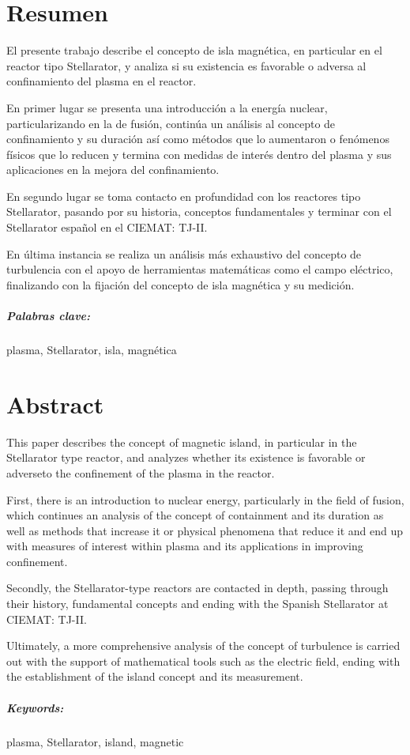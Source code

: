 \chapter*{Resumen}
El presente trabajo describe el concepto de isla magnética, en particular en el reactor tipo Stellarator, y analiza si su existencia es favorable o adversa
al confinamiento del plasma en el reactor.\par
En primer lugar se presenta una introducción a la energía nuclear, particularizando en la de fusión, continúa
un análisis al concepto de confinamiento y su duración así como métodos que lo aumentaron o fenómenos físicos que lo reducen y termina con medidas
de interés dentro del plasma y sus aplicaciones en la mejora del confinamiento.\par
En segundo lugar se toma contacto en profundidad con los reactores tipo Stellarator, pasando por su historia, 
conceptos fundamentales y terminar con el Stellarator español en el CIEMAT: TJ-II.\par
En última instancia se realiza un análisis más exhaustivo del concepto de turbulencia con el apoyo
de herramientas matemáticas como el campo eléctrico, finalizando con la fijación del concepto de isla
magnética y su medición.\par
\paragraph{Palabras clave:} plasma, Stellarator, isla, magnética
\chapter*{Abstract}
This paper describes the concept of magnetic island, in particular in the Stellarator type reactor, and 
analyzes whether its existence is favorable or adverseto the confinement of the plasma in the reactor.\par
First, there is an introduction to nuclear energy, particularly in the field of fusion, which continues 
an analysis of the concept of containment and its duration as well as methods that increase it or physical 
phenomena that reduce it and end up with measures of interest within plasma and its applications in improving confinement.\par
Secondly, the Stellarator-type reactors are contacted in depth, passing through their history, 
fundamental concepts and ending with the Spanish Stellarator at CIEMAT: TJ-II.\par
Ultimately, a more comprehensive analysis of the concept of turbulence is carried out with the support
of mathematical tools such as the electric field, ending with the establishment of the island concept
and its measurement.\par
\paragraph{Keywords:} plasma, Stellarator, island, magnetic
